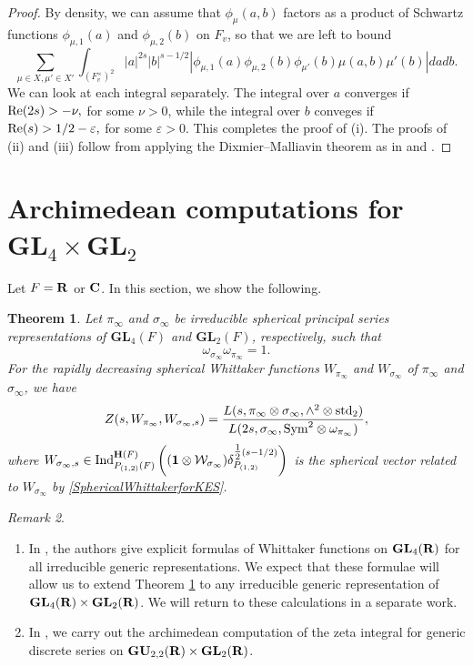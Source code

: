\documentclass[11pt, reqno]{amsart}
\theoremstyle{plain}
\newtheorem{theorem}{Theorem}[section]
\theoremstyle{definition}
\theoremstyle{remark}
\newtheorem{remark}[theorem]{Remark}
\theoremstyle{plain}
\def\C{{\bf C}}
\def\R{{\bf R}}
\def\H{{H}}
\def\epsilon{\varepsilon}
\def\H{\mathbf{H}}
\def\GU{{\mathbf{GU}}}
\def\GL{\mathbf{GL}}
\begin{document}
\begin{proof}
By density, we can assume that $\phi_\mu(a,b)$ factors as a product of Schwartz functions $\phi_{\mu,1}(a) $ and $ \phi_{\mu,2}(b)$ on $F_v$, so that we are left to bound 
$$ \sum_{\mu\in X,\mu' \in X'}\int_{(F_v^\times)^2} |a|^{2s}|b|^{s-1/2}| \phi_{\mu,1}(a) \phi_{\mu,2}(b)\phi_{\mu'}(b) \mu(a,b)\mu'(b)|da db.$$
We can look at each integral separately. The integral over $a$ converges if ${\rm Re}(2s) > - \nu,$ for some $\nu > 0$, while the integral over $b$ conveges if ${\rm Re}(s) > 1/2 - \epsilon,$ for some $\epsilon > 0$. This completes the proof of (i). 
    The proofs of (ii) and (iii) follow from applying the Dixmier--Malliavin theorem as in \cite[Lemma 9.1]{GanSavinSW} and \cite[Lemma 12.3]{GanGurevichCAP}. 
     
\end{proof}


\section{Archimedean computations for $\GL_4 \times \GL_2$}\label{sec:zeta:integral:arch}

Let $F = \R$ or  $\C$. In this section, we show the following. 

\begin{theorem}\label{Theorem_Arch_computation_split}
    Let $\pi_\infty$ and $\sigma_\infty$ be irreducible spherical principal series representations of $\GL_4(F)$ and $\GL_2(F)$, respectively, such that \[ \omega_{\sigma_\infty}\omega_{\pi_\infty} = 1.\] For the rapidly decreasing spherical Whittaker functions $W_{\pi_\infty}$ and $W_{\sigma_\infty}$ of $\pi_\infty$ and $\sigma_\infty$, we have 
    \[Z(s, W_{\pi_\infty}, W_{\sigma_\infty,s}) = \frac{L(s, \pi_\infty \otimes \sigma_\infty, \wedge^2 \otimes  \mathrm{std}_2)}{L(2s, \sigma_\infty, {\rm Sym}^2 \otimes \omega_{\pi_\infty})}, \]
    where $W_{\sigma_\infty,s} \in {\rm Ind}_{P_{(1,2)}(F)}^{\H(F)}\left((\mathbf{1} \otimes\mathcal{W}_{\sigma_\infty}) \delta_{P_{(1,2)}}^{\tfrac{1}{2}(s-1/2)}\right)$ is the spherical vector related to $W_{\sigma_\infty}$ by \eqref{SphericalWhittakerforKES}. 
\end{theorem}

\begin{remark} \leavevmode
\begin{enumerate}
    \item In \cite{HiranoIshiiMiyazakiGL4}, the authors give explicit formulas of Whittaker functions on $\GL_4(\R)$ for all irreducible generic representations. We expect that these formulae will allow us to extend Theorem \ref{Theorem_Arch_computation_split} to any irreducible generic representation of $\GL_4(\R) \times \GL_2(\R)$. We will return to these calculations in a separate work.
    \item In \cite{CauchiGutiArchGU}, we carry out the archimedean computation of the zeta integral for generic discrete series on $\GU_{2,2}(\R) \times \GL_2(\R)$.
\end{enumerate}
\end{remark}
\end{document}
